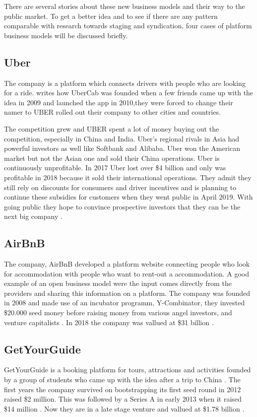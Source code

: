 \documentclass[a4paper, 11pt]{article}
\begin{document}
There are several stories about these new business models and their way to the public market. To get a better idea and to see if there are any pattern comparable with \cite{colombo2016open} research towards staging and syndication, four cases of platform business models will be discussed briefly.


\subsection{Uber}

The company is a platform which connects drivers with people who are looking for a ride. \cite{griswold} writes how UberCab was founded when a few friends came up with the idea in 2009 and launched the app in 2010,they were forced to change their namer to UBER rolled out their company to other cities and countries.

The competition grew and UBER spent a lot of money buying out the competition, especially in China and India. Uber’s regional rivals in Asia had powerful investors as well like Softbank and Alibaba. Uber won the American market but not the Asian one and sold their China operations. Uber is continuously unprofitable. In 2017 Uber lost over \$4 billion and only was profitable in 2018 because it sold their international operations. They admit they still rely on discounts for consumers and driver incentives and is planning to continue these subsidies for customers when they went public in April 2019. With going public they hope to convince prospective investors that they can be the next big company \cite{griswold}.

\subsection{AirBnB}
The company, AirBnB developed a platform website connecting people who look for accommodation with people who want to rent-out a accommodation. A good example of an open business model were the input comes directly from the providers and sharing this information on a platform. The company was founded in 2008 and made use of an incubator programm, Y-Combinator, they invested \$20.000 seed money before raising money from various angel investors, and venture capitalists \citep{mazzarini}. In 2018 the company was vallued at \$31 billion \citep{mazzarini}.

\subsection{GetYourGuide}
GetYourGuide is a booking platform for tours, attractions and activities founded by a group of students who came up with the idea after a trip to China \citep{getyourguide}. The first years the company survived on bootstrapping its first seed round in 2012 raised \$2 million. This was followed by a Series A in early 2013 when it raised \$14 million \citep{webintravel}. Now they are in a late stage venture and vallued at \$1.78 billion \citep{techcrunh}. 
\end{document}
